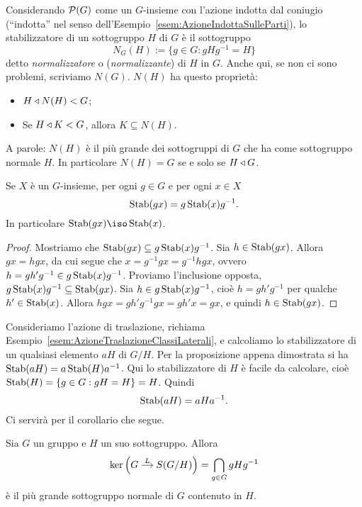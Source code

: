 \begin{esem}
Considerando $\mathcal{P}(G)$ come un $G$-insieme con l'azione indotta dal coniugio (\enquote{indotta} nel senso dell'Esempio~\ref{esem:AzioneIndottaSulleParti}), lo stabilizzatore di un sottogruppo $H$ di $G$ è il sottogruppo
\[ N_G(H):=\{g\in G :  gHg^{-1}=H\} \]
detto {\em normalizzatore} o ({\em normalizzante}) di $H$ in $G$. Anche qui, se non ci sono problemi, scriviamo $N(G)$. $ N(H)$ ha questo proprietà:
\begin{itemize}
\item $H \triangleleft N(H) < G$;
\item Se $H \triangleleft K < G$, allora $K \subseteq N(H)$.
\end{itemize}
A parole: $N(H)$ è il più grande dei sottogruppi di $G$ che ha come sottogruppo normale $H$. In particolare $ N(H) = G$ se e solo se $H \triangleleft G$.
\end{esem}

\begin{prop}
Se $X$ è un $G$-insieme, per ogni $g\in G$ e per ogni $x\in X$
\[
\operatorname{Stab}(gx)=g\operatorname{Stab}(x)g^{-1}.
\]
In particolare $\Stab(gx)\iso\Stab(x)$.
\end{prop}
\begin{proof}
Mostriamo che $\operatorname{Stab}(gx) \subseteq g\operatorname{Stab}(x)g^{-1}$. Sia $h\in\operatorname{Stab}(gx)$. Allora $gx=hgx$, da cui segue che $x=g^{-1}gx=g^{-1}hgx$, ovvero $h=gh'g^{-1}\in g\operatorname{Stab}(x)g^{-1}$. Proviamo l'inclusione opposta, $g\operatorname{Stab}(x)g^{-1}\subseteq\operatorname{Stab}(gx)$. Sia $h \in g\operatorname{Stab}(x)g^{-1}$, cioè $h=gh'g^{-1}$ per qualche $h' \in \operatorname{Stab}(x)$. Allora $hgx=gh'g^{-1}gx=gh'x=gx$, e quindi $h \in \operatorname{Stab}(gx)$.
\end{proof}


\begin{esem}
Consideriamo l'azione di traslazione, richiama Esempio~\ref{esem:AzioneTraslazioneClassiLaterali}, e calcoliamo lo stabilizzatore di un qualsiasi elemento $aH$ di $G/H$. Per la proposizione appena dimostrata si ha $\operatorname{Stab}(aH) = a \operatorname{Stab}(H) a^{-1}$. Qui lo stabilizzatore di $H$ è facile da calcolare, cioè $\operatorname{Stab}(H) = \{g\in G : gH=H\} = H$. Quindi
\[\operatorname{Stab}(aH) = aHa^{-1} .\]
Ci servirà per il corollario che segue.
\end{esem}

\begin{prop}
Sia $G$ un gruppo e $H$ un suo sottogruppo. Allora
\[\ker\left(\begin{tikzcd}[column sep=small,cramped] G \ar["L", r] & S(G/H) \end{tikzcd}\right)=\bigcap_{g\in G}gHg^{-1}\]
è il più grande sottogruppo normale di $G$ contenuto in $H$.
\end{prop}

